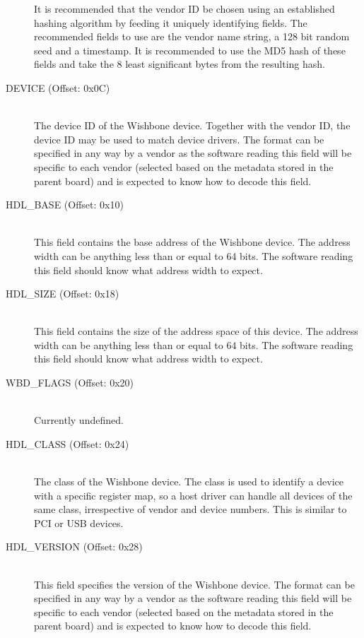 \documentclass{article}
\begin{document}
\begin{description}
It is recommended that the vendor ID be chosen using an established 
hashing algorithm by feeding it uniquely identifying fields. The
recommended fields to use are the vendor name string, a 128 bit random
seed and a timestamp. It is recommended to use the MD5 hash of these
fields and take the 8 least significant bytes from the resulting hash.

\item[DEVICE (Offset: 0x0C)] \hfill \\
The device ID of the Wishbone device. Together with the vendor ID, the
device ID may be used to match device drivers. The format can be specified
in any way by a vendor as the software reading this field will be
specific to each vendor (selected based on the metadata stored in the
parent board) and is expected to know how to decode this field.

\item[HDL\_BASE (Offset: 0x10)] \hfill \\
This field contains the base address of the Wishbone device. The address width
can be anything less than or equal to 64 bits. The software reading this
field should know what address width to expect.

\item[HDL\_SIZE (Offset: 0x18)] \hfill \\
This field contains the size of the address space of this device. The address width
can be anything less than or equal to 64 bits. The software reading this
field should know what address width to expect.

\item[WBD\_FLAGS (Offset: 0x20)] \hfill \\
Currently undefined.

\item[HDL\_CLASS (Offset: 0x24)] \hfill \\
The class of the Wishbone device. The class is used to identify a device
with a specific register map, so a host driver can handle all devices of
the same class, irrespective of vendor and device numbers. This is similar
to PCI or USB devices.

\item[HDL\_VERSION (Offset: 0x28)] \hfill \\
This field specifies the version of the Wishbone device. The format can be
specified in any way by a vendor as the software reading this field will be
specific to each vendor (selected based on the metadata stored in the
parent board) and is expected to know how to decode this field.


\end{description}
\end{document}
